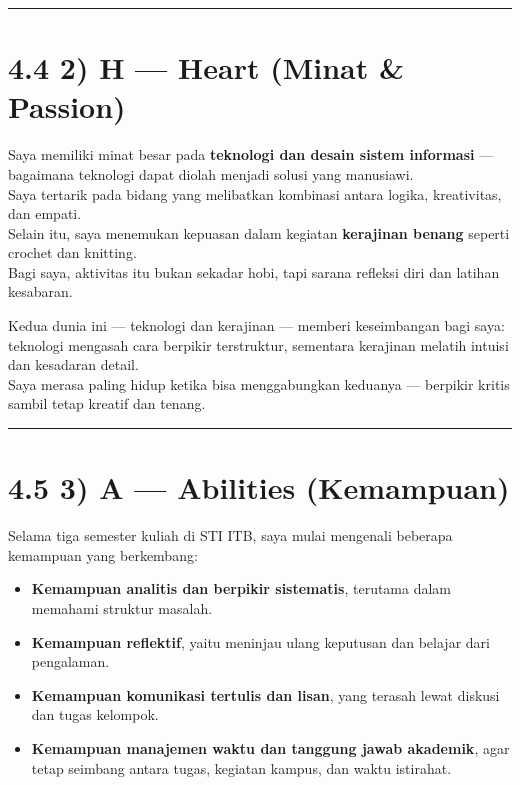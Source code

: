 \documentclass[
  letterpaper,
  DIV=11,
  numbers=noendperiod]{scrreprt}
\providecommand{\tightlist}{%
  \setlength{\itemsep}{0pt}\setlength{\parskip}{0pt}}
\begin{document}
\begin{center}\rule{0.5\linewidth}{0.5pt}\end{center}

\section{4.4 2) H --- Heart (Minat \&
Passion)}\label{h-heart-minat-passion}

Saya memiliki minat besar pada \textbf{teknologi dan desain sistem
informasi} --- bagaimana teknologi dapat diolah menjadi solusi yang
manusiawi.\\
Saya tertarik pada bidang yang melibatkan kombinasi antara logika,
kreativitas, dan empati.\\
Selain itu, saya menemukan kepuasan dalam kegiatan \textbf{kerajinan
benang} seperti crochet dan knitting.\\
Bagi saya, aktivitas itu bukan sekadar hobi, tapi sarana refleksi diri
dan latihan kesabaran.

Kedua dunia ini --- teknologi dan kerajinan --- memberi keseimbangan
bagi saya: teknologi mengasah cara berpikir terstruktur, sementara
kerajinan melatih intuisi dan kesadaran detail.\\
Saya merasa paling hidup ketika bisa menggabungkan keduanya --- berpikir
kritis sambil tetap kreatif dan tenang.

\begin{center}\rule{0.5\linewidth}{0.5pt}\end{center}

\section{4.5 3) A --- Abilities
(Kemampuan)}\label{a-abilities-kemampuan}

Selama tiga semester kuliah di STI ITB, saya mulai mengenali beberapa
kemampuan yang berkembang:

\begin{itemize}
\tightlist
\item
  \textbf{Kemampuan analitis dan berpikir sistematis}, terutama dalam
  memahami struktur masalah.\\
\item
  \textbf{Kemampuan reflektif}, yaitu meninjau ulang keputusan dan
  belajar dari pengalaman.\\
\item
  \textbf{Kemampuan komunikasi tertulis dan lisan}, yang terasah lewat
  diskusi dan tugas kelompok.\\
\item
  \textbf{Kemampuan manajemen waktu dan tanggung jawab akademik}, agar
  tetap seimbang antara tugas, kegiatan kampus, dan waktu istirahat.
\end{itemize}
\end{document}

